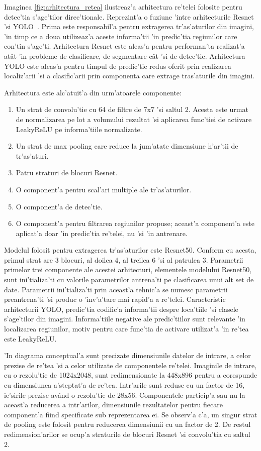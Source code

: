 \documentclass[12pt,a4paper,twoside]{report}
\begin{document}
Imaginea \ref{fig:arhitectura_retea} ilustreaz'a arhitectura re'telei folosite pentru detec'tia s'age'tilor direc'tionale. Reprezint'a o fuziune 'intre arhitecturile Resnet~\cite{Resnet} 'si YOLO~\cite{YOLO}. Prima este responsabil'a pentru extragerea tr'as'aturilor din imagini, 'in timp ce a doua utilizeaz'a aceste informa'tii 'in predic'tia regiunilor care con'tin s'age'ti. Arhitectura Resnet este aleas'a pentru performan'ta realizat'a at\^at 'in probleme de clasificare, de segmentare c\^at 'si de detec'tie. Arhitectura YOLO este aleas'a pentru timpul de predic'tie redus oferit prin realizarea localiz'arii 'si a clasific'arii prin componenta care extrage tras'aturile din imagini.

Arhitectura este alc'atuit'a din urm'atoarele componente:
\begin{enumerate}
\item Un strat de convolu'tie cu 64 de filtre de 7x7 'si saltul 2. Acesta este urmat de normalizarea pe lot a volumului rezultat 'si aplicarea func'tiei de activare LeakyReLU pe informa'tiile normalizate.
\item Un strat de max pooling care reduce la jum'atate dimensiune h'ar'tii de tr'as'aturi.
\item Patru straturi de blocuri Resnet.
\item O component'a pentru scal'ari multiple ale tr'as'aturilor.
\item O component'a de detec'tie.
\item O component'a pentru filtrarea regiunilor propuse; aceast'a component'a este aplicat'a doar 'in predic'tia re'telei, nu 'si 'in antrenare.
\end{enumerate}

Modelul folosit pentru extragerea tr'as'aturilor este Resnet50. Conform cu acesta, primul strat are 3 blocuri, al doilea 4, al treilea 6 'si al patrulea 3. Parametrii primelor trei componente ale acestei arhitecturi, elementele modelului Resnet50, sunt ini'tializa'ti cu valorile parametrilor antrena'ti pe clasificarea unui alt set de date. Parametrii ini'tializa'ti prin aceast'a tehnic'a se numesc parametrii preantrena'ti 'si produc o 'inv'a'tare mai rapid'a a re'telei. Caracteristic arhitecturii YOLO, predic'tia codific'a informa'tii despre loca'tiile 'si clasele s'age'tilor din imagini. Informa'tiile negative ale predic'tiilor sunt relevante 'in localizarea regiunilor, motiv pentru care func'tia de activare utilizat'a 'in re'tea este LeakyReLU.

'In diagrama conceptual'a sunt precizate dimensiunile datelor de intrare, a celor prezise de re'tea 'si a celor utilizate de componentele re'telei. Imaginile de intrare, cu o rezolu'tie de 1024x2048, sunt redimensionate la 448x896 pentru a corespunde cu dimensiunea a'steptat'a de re'tea. Intr'arile sunt reduse cu un factor de 16, ie'sirile prezise av\^and o rezolu'tie de 28x56. Componentele particip'a sau nu la aceast'a reducerea a intr'arilor, dimensiunile rezultatelor pentru fiecare  component'a fiind specificate sub reprezentarea ei. Se observ'a c'a, un singur strat de pooling este folosit pentru reducerea dimensiunii cu un factor de 2. De restul redimension'arilor se ocup'a straturile de blocuri Resnet 'si convolu'tia cu saltul 2.
 
\end{document}

